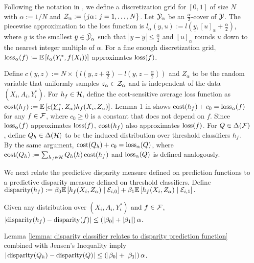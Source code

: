\documentclass{article}
\begin{document}
Following the notation in \cite{AgarwalEtAl(19)-FairRegression}, we define a discretization grid for $[0, 1]$ of size $N$ with $\alpha := 1/N$ and $\mathcal{Z}_{\alpha} := \{j \alpha \colon j = 1, \hdots, N\}$. Let $\tilde {\mathcal{Y}}_{\alpha}$ be an $\frac{\alpha}{2}$-cover of $\mathcal{Y}$. The piecewise approximation to the loss function is $l_{\alpha}(y, u) := l(\underline{y}, [u]_\alpha + \frac{\alpha}{2})$, where $\underline{y}$ is the smallest $\tilde y \in \tilde {\mathcal{Y}}_\alpha$ such that $|y - \tilde y|\leq \frac{\alpha}{2}$ and $[u]_\alpha$ rounds $u$ down to the nearest integer multiple of $\alpha$. For a fine enough discretization grid, $\operatorname{loss}_\alpha(f) := \mathbb{E}\left[l_\alpha(Y_i^*, f(X_i)) \right]$ approximates $\operatorname{loss}(f)$.

Define $c(y, z) := N \times \left( l(y, z + \frac{\alpha}{2}) - l(y, z - \frac{\alpha}{2}) \right)$ and $Z_\alpha$ to be the random variable that uniformly samples $z_\alpha \in \mathcal{Z}_\alpha$ and is independent of the data $(X_i, A_i, Y_i^*)$. For $h_f \in \mathcal{H}$, define the cost-sensitive average loss function as $\operatorname{cost}(h_f) := \mathbb{E}\left[ c(\underline{Y}^*_i, Z_\alpha) h_f(X_i, Z_\alpha) \right]$. Lemma 1 in \cite{AgarwalEtAl(19)-FairRegression} shows $\operatorname{cost}(h_f) + c_0 = \operatorname{loss}_\alpha(f)$ for any $f \in \mathcal{F}$, where $c_0 \geq 0$ is a constant that does not depend on $f$. Since $\operatorname{loss}_\alpha(f)$ approximates $\operatorname{loss}(f)$, $\operatorname{cost}(h_f)$ also approximates $\operatorname{loss}(f)$. For $Q \in \Delta(\mathcal{F})$, define $Q_h \in \Delta(\mathcal{H})$ to be the induced distribution over threshold classifiers $h_f$. By the same argument, $\operatorname{cost}(Q_h) + c_0 = \operatorname{loss}_\alpha(Q)$, where $\operatorname{cost}(Q_h) := \sum_{h_f \in \mathcal{H}} Q_h(h) \operatorname{cost}(h_f)$ and $\operatorname{loss}_\alpha(Q)$ is defined analogously.

We next relate the predictive disparity measure defined on prediction functions to a predictive disparity measure defined on threshold classifiers. Define $\operatorname{disparity}(h_f) := \beta_0 \mathbb{E}\left[ h_f(X_i, Z_\alpha) \mid \mathcal{E}_{i,0} \right] + \beta_1 \mathbb{E}\left[ h_f(X_i, Z_\alpha) \mid \mathcal{E}_{i,1} \right].$
\begin{lemma}\label{lemma: disparity classifier relates to disparity prediction function}
    Given any distribution over $(X_i, A_i, Y_i^*)$ and $f \in \mathcal{F}$, $\left| \operatorname{disparity}(h_f) - \operatorname{disparity}(f) \right| \leq \left(|\beta_0| + |\beta_1|\right) \alpha$.
\end{lemma}
\noindent Lemma \ref{lemma: disparity classifier relates to disparity prediction function} combined with Jensen's Inequality imply ${|\operatorname{disparity}(Q_h) - \operatorname{disparity}(Q)| \leq \left(|\beta_0| + |\beta_1|\right) \alpha}$.
\end{document}
